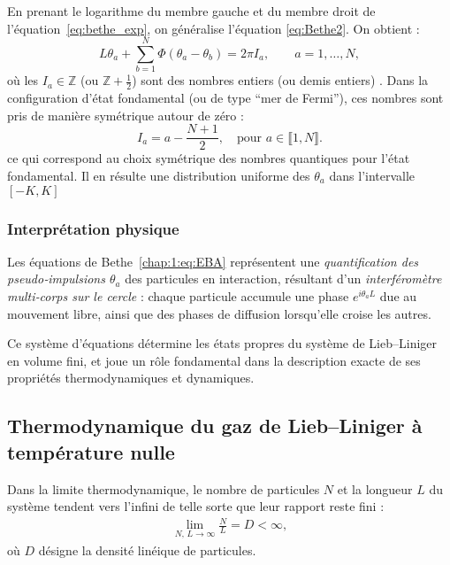 En prenant le logarithme du membre gauche et du membre droit de l’équation~\eqref{eq:bethe_exp}, on généralise l'équation \eqref{eq:Bethe2}. On obtient :
\begin{equation}\label{chap:1:eq:EBA}
	L \theta_a + \sum_{b=1}^N \Phi(\theta_a - \theta_b) = 2\pi I_a, \qquad a = 1, \dots, N,
\end{equation}
où les $I_a \in \mathbb{Z}$ (ou $\mathbb{Z} + \tfrac{1}{2}$) sont des nombres entiers (ou demis entiers) . Dans la configuration d’état fondamental (ou de type “mer de Fermi”), ces nombres sont pris de manière symétrique autour de zéro :
\begin{equation}
I_a = a - \frac{N+1}{2}, \quad \text{pour } a \in \llbracket 1 , N \rrbracket.
\end{equation}
ce qui correspond au choix symétrique des nombres quantiques pour l’état fondamental. Il en résulte une distribution uniforme des $\theta_a$ dans l’intervalle $[-K , K ]$

\subsubsection{Interprétation physique}

Les équations de Bethe~\eqref{chap:1:eq:EBA} représentent une {\em quantification des pseudo‑impulsions $\theta_a$} des particules en interaction, résultant d’un {\em interféromètre multi‑corps sur le cercle} : chaque particule accumule une phase $e^{i \theta_a L}$ due au mouvement libre, ainsi que des phases de diffusion lorsqu’elle croise les autres.

Ce système d'équations détermine les états propres du système de Lieb–Liniger en volume fini, et joue un rôle fondamental dans la description exacte de ses propriétés thermodynamiques et dynamiques.


\subsection{Thermodynamique du gaz de Lieb–Liniger à température nulle}

Dans la limite thermodynamique, le nombre de particules \( N \) et la longueur \( L \) du système tendent vers l'infini de telle sorte que leur rapport reste fini :
\begin{eqnarray*}
	\lim_{N,\, L \to \infty} \frac{N}{L} = D < \infty,
\end{eqnarray*}
où \( D \) désigne la densité linéique de particules.

